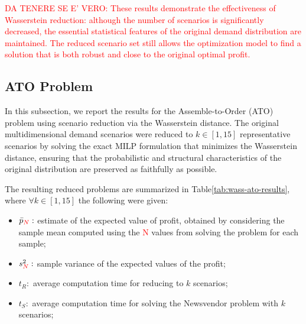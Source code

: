 \documentclass[a4paper,12pt]{article}
\begin{document}
	\label{tab:wass-nv-results}
	
	
	\textcolor{red}{DA TENERE SE E' VERO: These results demonstrate the effectiveness of Wasserstein reduction: although the number of scenarios is significantly decreased, the essential statistical features of the original demand distribution are maintained. The reduced scenario set still allows the optimization model to find a solution that is both robust and close to the original optimal profit.}	\newpage
	\subsection{ATO Problem}
	
	In this subsection, we report the results for the Assemble-to-Order (ATO) problem using scenario reduction via the Wasserstein distance. The original multidimensional demand scenarios were reduced to $k \in [1,15]$ representative scenarios by solving the exact MILP formulation that minimizes the Wasserstein distance, ensuring that the probabilistic and structural characteristics of the original distribution are preserved as faithfully as possible.
	
	The resulting reduced problems are summarized in Table\ref{tab:wass-ato-results}, where $\forall k \in [1,15]$ the following were given:
	\begin{itemize}
		\item $\bar{p}_{\textcolor{red}{N}}:$ estimate of the expected value of profit, obtained by considering the sample mean computed using the \textcolor{red}{N} values from solving the problem for each sample; 
		\item $s^{2}_{\textcolor{red}{N}}:$ sample variance of the expected values of the profit;
		\item $t_{R}:$ average computation time for reducing to $k$ scenarios;
		\item $t_{S}:$ average computation time for solving the Newsvendor problem with $k$ scenarios;
	\end{itemize}~
	
\end{document}
